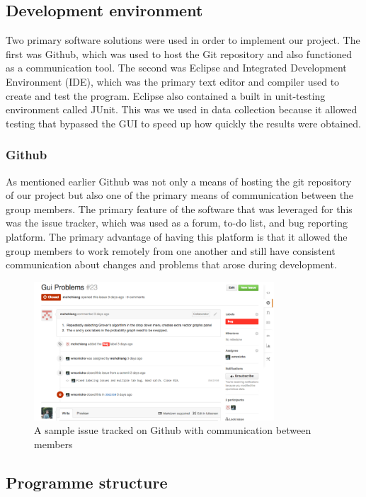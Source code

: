 \documentclass[bibliography=totocnumbered, 10pt]{article}
\theoremstyle{NoticeStyle}
\begin{document}
\subsection{Development environment}
Two primary software solutions were used in order to implement our project.  The first was Github, which was used to host the Git repository and also functioned as a communication tool. The second was Eclipse and Integrated Development Environment (IDE), which was the primary text editor and compiler used to create and test the program. Eclipse also contained a built in unit-testing environment called JUnit. This was we used in data collection because it allowed testing that bypassed the GUI to speed up how quickly the results were obtained.

\subsubsection{Github}
As mentioned earlier Github was not only a means of hosting the git repository of our project but also one of the primary means of communication between the group members. The primary feature of the software that was leveraged for this was the issue tracker, which was used as a forum, to-do list, and bug reporting platform. The primary advantage of having this platform is that it allowed the group members to work remotely from one another and still have consistent communication about changes and problems that arose during development.

\begin{figure}[H]
\centering
\includegraphics[width=0.8\textwidth]{img/issue_example.pdf}
\caption{A sample issue tracked on Github with communication between members}
\end{figure}

\subsection{Programme structure}
\end{document}
